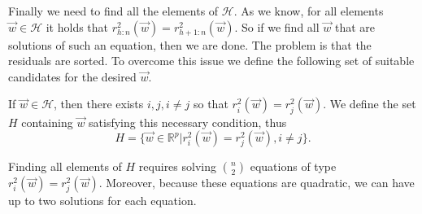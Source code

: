 


      


Finally we need to find all the elements of $\mathcal{H}$. As we know, for all elements $\vec{w} \in \mathcal{H}$ it holds that $r^{2}_{h:n}(\vec{w}) = r^{2}_{h+1:n}(\vec{w})$. So if we find all $\vec{w}$ that are solutions of such an equation, then we are done. The problem is that the residuals are sorted. To overcome this issue we define the following set of suitable candidates for the desired $\vec{w}$.


If $\vec{w} \in \mathcal{H}$, then there exists $i,j, i \neq j$ so that
    $r^{2}_i(\vec{w}) = r^{2}_j(\vec{w})$. We define the set $H$ containing $\vec{w}$ satisfying this necessary condition, thus
\begin{equation}
    H = \{{ \vec{w} \in \mathbb{R}^p | r^{2}_i(\vec{w}) = r^{2}_j(\vec{w}), i \neq j  \}}.   
\end{equation}
    
Finding all elements of $H$ requires solving $\binom{n}{2}$ equations of type $r^{2}_i(\vec{w}) = r^{2}_j(\vec{w})$. Moreover, because these equations are quadratic, we can have up to two solutions for each equation.

